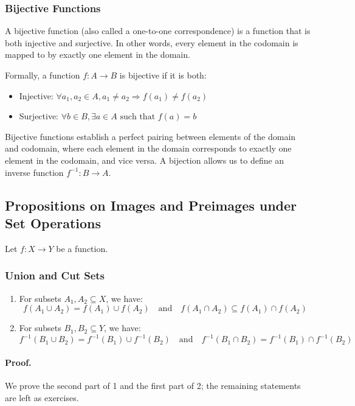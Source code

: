 \subsubsection{Bijective Functions}
A bijective function (also called a one-to-one correspondence) is a function that is both injective and surjective. In other words, every element in the codomain is mapped to by exactly one element in the domain.

Formally, a function $f: A \rightarrow B$ is bijective if it is both:
\begin{itemize}
	\item Injective: $\forall a_1, a_2 \in A, a_1 \neq a_2 \Rightarrow f(a_1) \neq f(a_2)$
	\item Surjective: $\forall b \in B, \exists a \in A \text{ such that } f(a) = b$
\end{itemize}
\noindent Bijective functions establish a perfect pairing between elements of the domain and codomain, where each element in the domain corresponds to exactly one element in the codomain, and vice versa. A bijection allows us to define an inverse function $f^{-1}: B \rightarrow A$.

\subsection{Propositions on Images and Preimages under Set Operations}

Let \( f : X \to Y \) be a function.

\subsubsection{Union and Cut Sets}
\begin{enumerate}[label=\roman*]
	\item For subsets \( A_1, A_2 \subseteq X \), we have:
	      \[
		      f(A_1 \cup A_2) = f(A_1) \cup f(A_2)
		      \quad \text{and} \quad
		      f(A_1 \cap A_2) \subseteq f(A_1) \cap f(A_2)
	      \]

	\item For subsets \( B_1, B_2 \subseteq Y \), we have:
	      \[
		      f^{-1}(B_1 \cup B_2) = f^{-1}(B_1) \cup f^{-1}(B_2)
		      \quad \text{and} \quad
		      f^{-1}(B_1 \cap B_2) = f^{-1}(B_1) \cap f^{-1}(B_2)
	      \]
\end{enumerate}

\paragraph{Proof.}
We prove the second part of 1 and the first part of 2; the remaining statements are left as exercises.

